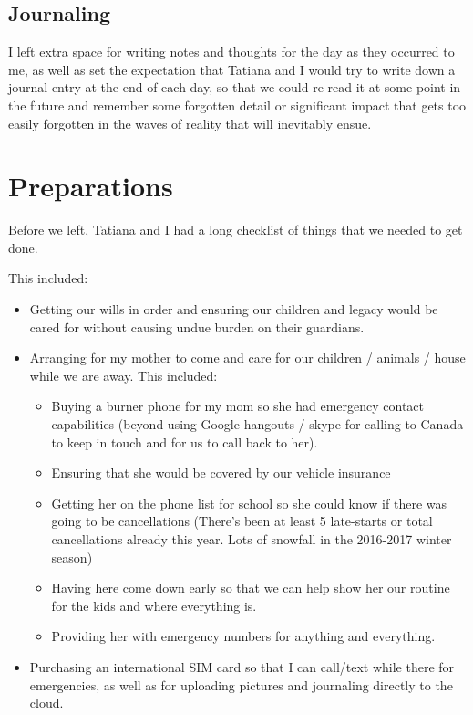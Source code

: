\documentclass[letterpaper]{report}
\begin{document}
\subsection{Journaling}
I left extra space for writing notes and thoughts for the day as they occurred 
to me,
as well as set the expectation that Tatiana and I would try to write down a
journal entry at the end of each day, so that we could re-read it at some 
point in the future and remember some forgotten detail or significant impact
that gets too easily forgotten in the waves of reality that will inevitably
ensue.

\section{Preparations}
Before we left, Tatiana and I had a long checklist
of things that we needed to get done.

This included:
\begin{itemize}
    \item Getting our wills in order and ensuring our children and legacy would
    be cared for without causing undue burden on their guardians.
    \item Arranging for my mother to come and care for our children / animals / house while we are away.  This included:
    \begin{itemize}
        \item Buying a burner phone for my mom so she had emergency contact 
        capabilities (beyond using Google hangouts / skype for calling to
        Canada to keep in touch and for us to call back to her).
        \item Ensuring that she would be covered by our vehicle insurance
        \item Getting her on the phone list for school so she could know if 
        there was going to be cancellations
        (There's been at least 5 late-starts or total cancellations already 
        this year. Lots of snowfall in the 2016-2017 winter season)
        \item Having here come down early so that we can help show her our routine for the kids and where everything is.
        \item Providing her with emergency numbers for anything and everything.
    \end{itemize}
    \item Purchasing an international SIM card so that I can call/text while
    there for emergencies,
    as well as for uploading pictures and journaling
    directly to the cloud.
\end{itemize}
\end{document}
